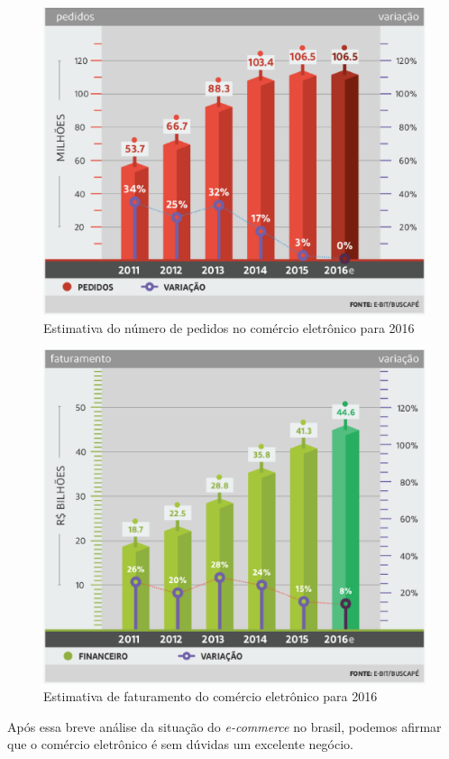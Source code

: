 \documentclass[a4paper,12pt]{monografia}
\begin{document}
\begin{figure}[H]
\centering
\includegraphics[width=12cm]{img/webshoppers/estimativa-pedidos.eps}
\caption{Estimativa do número de pedidos no comércio eletrônico para 2016}
\label{figura:estimativa:pedidos}
\end{figure}

\begin{figure}[H]
\centering
\includegraphics[width=12cm]{img/webshoppers/estimativa-faturamento.eps}
\caption{Estimativa de faturamento do comércio eletrônico para 2016}
\label{figura:estimativa:faturamento}
\end{figure}

Após essa breve análise da situação do \textit{e-commerce} no brasil, podemos afirmar que o comércio eletrônico é sem dúvidas um excelente negócio. 
\end{document}
